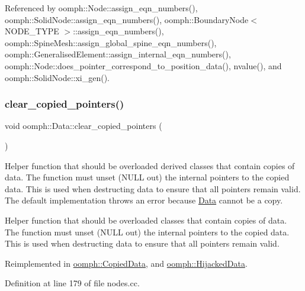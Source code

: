 Referenced by oomph\+::\+Node\+::assign\+\_\+eqn\+\_\+numbers(), oomph\+::\+Solid\+Node\+::assign\+\_\+eqn\+\_\+numbers(), oomph\+::\+Boundary\+Node$<$ N\+O\+D\+E\+\_\+\+T\+Y\+P\+E $>$\+::assign\+\_\+eqn\+\_\+numbers(), oomph\+::\+Spine\+Mesh\+::assign\+\_\+global\+\_\+spine\+\_\+eqn\+\_\+numbers(), oomph\+::\+Generalised\+Element\+::assign\+\_\+internal\+\_\+eqn\+\_\+numbers(), oomph\+::\+Node\+::does\+\_\+pointer\+\_\+correspond\+\_\+to\+\_\+position\+\_\+data(), nvalue(), and oomph\+::\+Solid\+Node\+::xi\+\_\+gen().

\mbox{\label{classoomph_1_1Data_a409e3140829def2b1e738a24cc1f48bb}} 
\subsubsection{\texorpdfstring{clear\+\_\+copied\+\_\+pointers()}{clear\_copied\_pointers()}}
{\footnotesize\ttfamily void oomph\+::\+Data\+::clear\+\_\+copied\+\_\+pointers (\begin{DoxyParamCaption}{ }\end{DoxyParamCaption})\hspace{0.3cm}{\ttfamily [virtual]}}



Helper function that should be overloaded derived classes that contain copies of data. The function must unset (N\+U\+LL out) the internal pointers to the copied data. This is used when destructing data to ensure that all pointers remain valid. The default implementation throws an error because \hyperlink{classoomph_1_1Data}{Data} cannot be a copy. 

Helper function that should be overloaded classes that contain copies of data. The function must unset (N\+U\+LL out) the internal pointers to the copied data. This is used when destructing data to ensure that all pointers remain valid. 

Reimplemented in \hyperlink{classoomph_1_1CopiedData_a675b1811d9c6b1ba1ce4bbcb7b681245}{oomph\+::\+Copied\+Data}, and \hyperlink{classoomph_1_1HijackedData_aff8443f8455e18b3893c094326c4d212}{oomph\+::\+Hijacked\+Data}.



Definition at line 179 of file nodes.\+cc.



